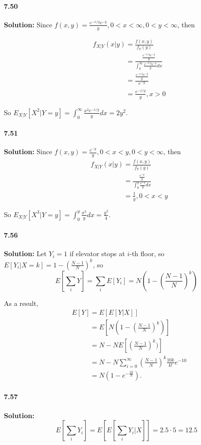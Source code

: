 \documentclass[11pt]{article}
\begin{document}
	\paragraph{7.50}\textbf{Solution:}
		Since $f(x, y) = \frac{e^{-x/y}e^{-y}}{y}, 0 < x < \infty, 0 < y < \infty$, then 
		
		\begin{align}
			&f_{X|Y}(x|y) = \frac{f(x, y)}{f_Y(y)}\nonumber\\
			&\phantom{f_{X|Y}(x|y)} = \frac{\frac{e^{-x/y}e^{-y}}{y}}{\int_0^{\infty} \frac{e^{-x/y}e^{-y}}{y}dx}\nonumber\\
			&\phantom{f_{X|Y}(x|y)} = \frac{\frac{e^{-x/y}e^{-y}}{y}}{e^{-y}}\nonumber\\
			&\phantom{f_{X|Y}(x|y)} = \frac{e^{-x/y}}{y}, x > 0\nonumber
		\end{align}
		
		So $E_{X|Y}[X^2 | Y = y] = \int_0^{\infty} \frac{x^2e^{-x/y}}{y}dx = 2y^2$.
	\paragraph{7.51}\textbf{Solution:}
		Since $f(x, y) = \frac{e^{-y}}{y}, 0 < x < y, 0 < y < \infty$, then 
		\begin{align}
			&f_{X|Y}(x|y) = \frac{f(x, y)}{f_Y(y)}\nonumber\\
			&\phantom{f_{X|Y}(x|y)} = \frac{\frac{e^{-y}}{y}}{\int_0^y \frac{e^{-y}}{y} dx}\nonumber\\
			&\phantom{f_{X|Y}(x|y)} = \frac{1}{y}, 0< x < y\nonumber
		\end{align}
		
		So $E_{X|Y}[X^3|Y = y] = \int_0^y \frac{x^3}{y}dx = \frac{y^3}{4}$.
	\paragraph{7.56}\textbf{Solution:}
		Let $Y_i = 1$ if elevator stops at $i$-th floor, so $E[Y_i | X = k] = 1 - (\frac{N - 1}{N})^k$, so
		\[E[\sum_i Y] = \sum_i E[Y_i] = N(1 - (\frac{N - 1}{N})^k)\]
		
		As a result,
		\begin{align}
			&E[Y] = E[E[Y|X]]\nonumber\\
			&\phantom{E[Y]} = E[N(1 - (\frac{N - 1}{N})^k)]\nonumber\\
			&\phantom{E[Y]} = N - NE[(\frac{N - 1}{N})^k)]\nonumber\\
			&\phantom{E[Y]} = N - N\sum_{i = 0}^{\infty} (\frac{N - 1}{N})^k\frac{10k}{k!}e^{-10}\nonumber\\
			&\phantom{E[Y]} = N(1 - e^{-\frac{10}{N}}).\nonumber
		\end{align}
	\paragraph{7.57}\textbf{Solution:}
		\[E[\sum_i Y_i] = E[E[\sum_i Y_i|X]] = 2.5 \cdot 5 = 12.5\]
\end{document}
